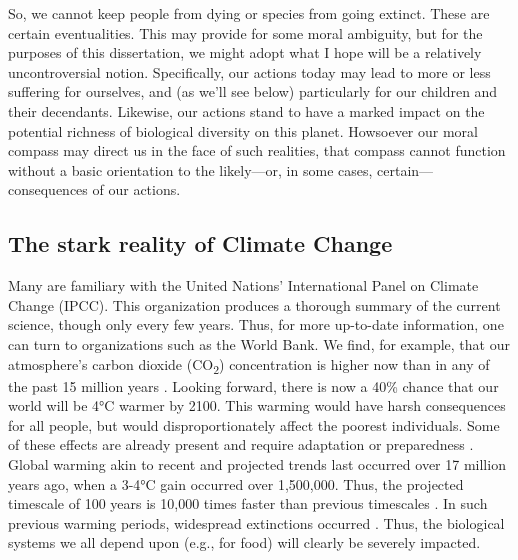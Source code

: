 So, we cannot keep people from dying or species from going extinct. These are
certain eventualities. This may provide for some moral ambiguity, but for the
purposes of this dissertation, we might adopt what I hope will be a relatively
uncontroversial notion. Specifically, our actions today may lead to more or
less suffering for ourselves, and (as we'll see below) particularly for our
children and their decendants. Likewise, our actions stand to have a marked
impact on the potential richness of biological diversity on this planet.
Howsoever our moral compass may direct us in the face of such realities,
that compass cannot function without a basic orientation to the likely---or, in
some cases, certain---consequences of our actions.

\subsection{The stark reality of Climate Change}


Many are familiary with the United Nations' International Panel on Climate
Change (IPCC). This organization produces a thorough summary of the current
science, though only every few years. Thus, for more up-to-date information, one
can turn to organizations such as the World Bank. We find, for example, that our
atmosphere's carbon dioxide (CO\textsubscript{2}) concentration is higher now
than in any of the past 15 million years \parencite{world_bank_turn_2012}.
Looking forward, there is now a 40\% chance that our world will be 4°C warmer by
2100. This warming would have harsh consequences for all people, but would
disproportionately affect the poorest individuals.  Some of these effects are
already present and require adaptation or preparedness
\parencite{potsdam_institute_for_climate_impact_research_and_climate_analytics_turn_2013}.
Global warming akin to recent and projected trends last occurred over 17 million
years ago, when a 3-4°C gain occurred over 1,500,000. Thus, the projected
timescale of 100 years is 10,000 times faster than previous timescales
\parencite{barnosky_heatstroke:_2009}. In such previous warming periods,
widespread extinctions occurred \parencite{mayhew_long-term_2008}. Thus, the
biological systems we all depend upon (e.g., for food) will clearly be severely
impacted.

